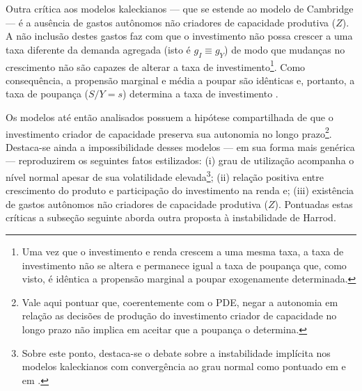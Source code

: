 Outra crítica aos modelos kaleckianos --- que se estende ao modelo de Cambridge --- é a ausência de gastos autônomos não criadores de capacidade produtiva ($Z$).
A não inclusão destes gastos faz com que o investimento não possa crescer a uma taxa diferente da demanda agregada (isto é $g_I \equiv g_Y$) de modo que mudanças no crescimento não são capazes de alterar a taxa de investimento\footnote{Uma vez que o investimento e renda crescem a uma mesma taxa, a taxa de investimento não se altera e permanece igual a taxa de poupança que, como visto, é idêntica a propensão marginal a poupar exogenamente determinada.}. 
Como consequência, a propensão marginal e média a poupar são idênticas e, portanto, a taxa de poupança ($S/Y = s$) determina a taxa de investimento \cite[p.~5--7]{fagundes_role_2017}.

 
Os modelos até então analisados possuem a hipótese compartilhada de que o investimento criador de capacidade preserva sua autonomia no longo prazo\footnote{Vale aqui pontuar que, coerentemente com o PDE, negar a autonomia em relação as decisões de produção do investimento criador de capacidade no longo prazo não implica em aceitar que a poupança o determina.}.  
Destaca-se ainda a impossibilidade desses modelos --- em sua forma mais genérica --- reproduzirem os seguintes fatos estilizados: 
(i) grau de utilização acompanha o nível normal apesar de sua volatilidade elevada\footnote{Sobre este ponto, destaca-se o debate sobre a instabilidade implícita nos modelos kaleckianos com convergência ao grau normal como pontuado em \textcite{hein_instability_2011} e em \textcite{allain_tackling_2015}.}; 
(ii) relação positiva entre crescimento do produto e participação do investimento na renda e;
(iii) existência de gastos autônomos não criadores de capacidade produtiva ($Z$).
Pontuadas estas críticas a subseção seguinte aborda outra proposta à instabilidade de Harrod.


